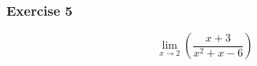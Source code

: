 \documentclass[12pt]{beamer}
\begin{document}
\begin{frame}
	\frametitle{Exercise 5}
	\vspace*{\fill}
	\vspace*{\fill}
	\vspace*{\fill}
	\initclock
	\Large
	\[\displaystyle\lim_{x\to2}\left(\frac{x+3}{x^2+x-6}\right)\]\\
	\vspace*{\fill}
	\vspace*{\fill}
	\vspace*{\fill}
	\vspace*{\fill}
	\crono
\end{frame}
\end{document}
